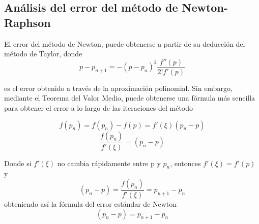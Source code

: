 \subsection{Análisis del error del método de Newton-Raphson}

El error del método de Newton, puede obtenerse a partir de su deducción del método de Taylor, donde 
\begin{displaymath}
p - p_{n+1} =  - (p-p_n)^2 \frac{f''(p)}{2!f'(p)}
\end{displaymath}

es el error obtenido a través de la aproximación polinomial. 
Sin embargo, mediante el Teorema del Valor Medio, puede obtenerse una fórmula más sencilla para obtener el error a lo largo de las iteraciones del método

\begin{displaymath}
f(p_n)= f(p_n) - f(p) = f'(\xi)(p_n-p)
\end{displaymath}
\begin{displaymath}
\frac{f(p_n)}{ f'(\xi)} =(p_n-p)
\end{displaymath}

Donde si $f'(\xi)$ no cambia rápidamente entre p y $p_n$, entonces $f'(\xi) = f'(p)$ y
\begin{displaymath}
(p_n-p)= \frac{f(p_n)}{ f'(\xi)} = p_{n+1} - p_n
\end{displaymath}
obteniendo así la fórmula del error estándar de Newton
\begin{equation}
(p_n-p)=  p_{n+1} - p_n
\end{equation}